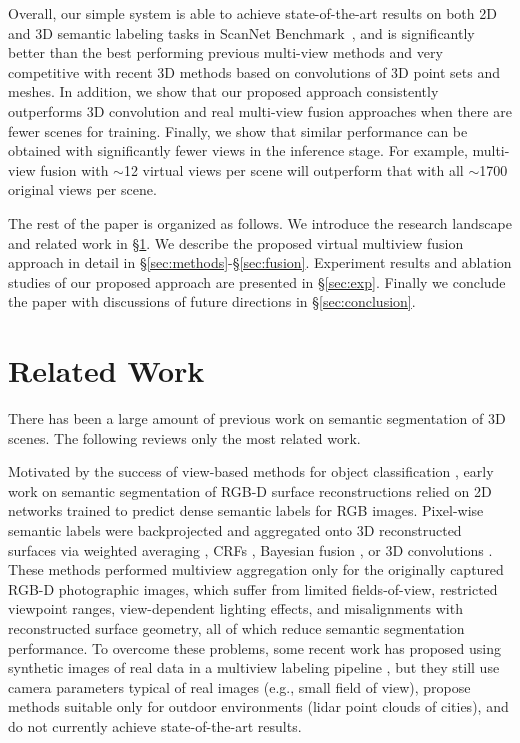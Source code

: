 \documentclass[runningheads]{llncs}
\newcommand{\Sec}[1]{\S\ref{#1}}
\begin{document}
Overall, our simple system is able to achieve state-of-the-art results on both 2D and 3D semantic labeling tasks in ScanNet Benchmark~\cite{dai2017scannet}, and is significantly better than the best performing previous multi-view methods and very competitive with recent 3D methods based on convolutions of 3D point sets and meshes. In addition, we show that our proposed approach consistently outperforms 3D convolution and real multi-view fusion approaches when there are fewer scenes for training. Finally, we show that similar performance can be obtained with significantly fewer views in the inference stage. For example, multi-view fusion with $\sim$12 virtual views per scene will outperform that with all $\sim$1700 original views per scene.

The rest of the paper is organized as follows. We introduce the research landscape and related work in \Sec{sec:related_work}. We describe the proposed virtual multiview fusion approach in detail in \Sec{sec:methods}-\Sec{sec:fusion}. Experiment results and ablation studies of our proposed approach are presented in \Sec{sec:exp}. Finally we conclude the paper with discussions of future directions in \Sec{sec:conclusion}.

%
 \section{Related Work}\label{sec:related_work}

There has been a large amount of previous work on semantic segmentation of 3D scenes.  The following reviews only the most related work.

\vspace*{2mm}  Motivated by the success of view-based methods for object classification \cite{su2015multi}, early work on semantic segmentation of RGB-D surface reconstructions relied on 2D networks trained to predict dense semantic labels for RGB images.  Pixel-wise semantic labels were backprojected and aggregated onto 3D reconstructed surfaces via weighted averaging \cite{hermans2014dense,vineet2015incremental}, CRFs \cite{mccormac2017semanticfusion}, Bayesian fusion \cite{ma2017multi,vineet2015incremental,zhang2019large}, or 3D convolutions \cite{dai20183dmv,jaritz2019multi,lai2014unsupervised}.  These methods performed multiview aggregation only for the originally captured RGB-D photographic images, which suffer from limited fields-of-view, restricted viewpoint ranges, view-dependent lighting effects, and misalignments with reconstructed surface geometry, all of which reduce semantic segmentation performance.   To overcome these problems, some recent work has proposed using synthetic images of real data in a multiview labeling pipeline \cite{boulch2018snapnet,lawin2017deep,guerry2017snapnet}, but they still use camera parameters typical of real images (e.g., small field of view), propose methods suitable only for outdoor environments (lidar point clouds of cities), and do not currently achieve state-of-the-art results.
\end{document}
